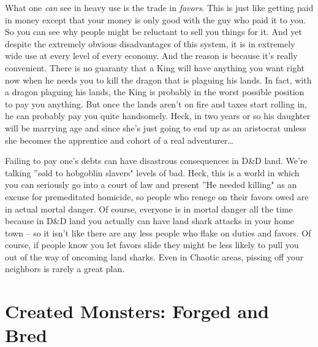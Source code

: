 What one \textit{can} see in heavy use is the trade in \textit{favors}. This is just like getting paid in money except that your money is only good with the guy who paid it to you. So you can see why people might be reluctant to sell you things for it. And yet despite the extremely obvious disadvantages of this system, it is in extremely wide use at every level of every economy. And the reason is because it's really convenient. There is no guaranty that a King will have anything you want right now when he needs you to kill the dragon that is plaguing his lands. In fact, with a dragon plaguing his lands, the King is probably in the worst possible position to pay you anything. But once the lands aren't on fire and taxes start rolling in, he can probably pay you quite handsomely. Heck, in two years or so his daughter will be marrying age and since she's just going to end up as an aristocrat unless she becomes the apprentice and cohort of a real adventurer\ldots

Failing to pay one's debts can have disastrous consequences in D\&D land. We're talking ''sold to hobgoblin slavers" levels of bad. Heck, this is a world in which you can seriously go into a court of law and present ''He needed killing" as an excuse for premeditated homicide, so people who renege on their favors owed are in actual mortal danger. Of course, everyone is in mortal danger all the time because in D\&D land you actually can have land shark attacks in your home town -- so it isn't like there are any less people who flake on duties and favors. Of course, if people know you let favors slide they might be less likely to pull you out of the way of oncoming land sharks. Even in Chaotic areas, pissing off your neighbors is rarely a great plan.


\section{Created Monsters: Forged and Bred}
\vspace*{-8pt}

